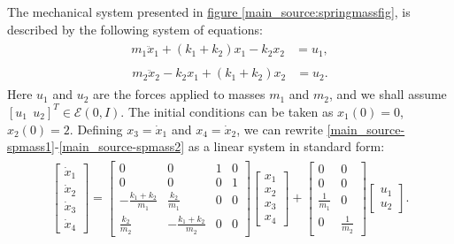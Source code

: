 \documentclass[letterpaper,10pt,english]{sphinxmanual}
\begin{document}
The mechanical system presented in \hyperref[main_source:springmassfig]{figure  \ref*{main_source:springmassfig}}, is described
by the following system of equations:
\label{main_source:equation-spmass1}\begin{gather}
\begin{split}m_1\ddot{x}_1+(k_1+k_2)x_1-k_2x_2 & = u_1,\end{split}\label{main_source-spmass1}
\end{gather}\label{main_source:equation-spmass2}\begin{gather}
\begin{split}m_2\ddot{x}_2-k_2x_1+(k_1+k_2)x_2 & = u_2 .\end{split}\label{main_source-spmass2}
\end{gather}
Here $u_1$ and $u_2$ are the forces applied to masses
$m_1$ and $m_2$, and we shall assume
$[u_1 ~~ u_2]^T\in{\mathcal E}(0,I)$. The initial conditions can
be taken as $x_1(0)=0$, $x_2(0)=2$. Defining
$x_3=\dot{x}_1$ and $x_4=\dot{x}_2$, we can rewrite
\eqref{main_source-spmass1}-\eqref{main_source-spmass2} as a linear system in standard form:
\label{main_source:equation-spmassls}\begin{gather}
\begin{split}\left[\begin{array}{c}
\dot{x}_1 \\
\dot{x}_2 \\
\dot{x}_3 \\
\dot{x}_4 \end{array}\right] = \left[\begin{array}{cccc}
0 & 0 & 1 & 0\\
0 & 0 & 0 & 1\\
-\frac{k_1+k_2}{m_1} & \frac{k_2}{m_1} & 0 & 0\\
\frac{k_2}{m_2} & -\frac{k_1+k_2}{m_2} & 0 & 0\end{array}\right]
\left[\begin{array}{c}
x_1 \\
x_2 \\
x_3 \\
x_4 \end{array}\right] + \left[\begin{array}{cc}
0 & 0\\
0 & 0\\
\frac{1}{m_1} & 0\\
0 & \frac{1}{m_2}\end{array}\right]\left[\begin{array}{c}
u_1\\
u_2\end{array}\right].\end{split}\label{main_source-spmassls}
\end{gather}
\end{document}
